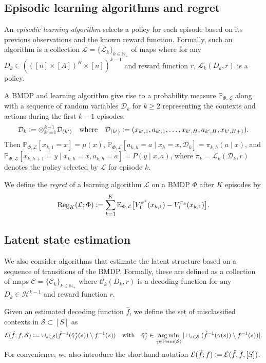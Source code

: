 \documentclass[11pt]{article}
\newcommand{\eqdef}{\vcentcolon=}
\newcommand{\mcC}{\mathcal{C}}
\newcommand{\mcD}{\mathcal{D}}
\newcommand{\mcE}{\mathcal{E}}
\newcommand{\mcH}{\mathcal{H}}
\newcommand{\mcL}{\mathcal{L}}
\newcommand{\mcS}{\mathcal{S}}
\newcommand{\mbbP}{\mathbb{P}}
\newcommand{\mbbE}{\mathbb{E}}
\newcommand{\mbbN}{\mathbb{N}}
\newcommand{\reg}{\textnormal{Reg}}
\DeclareMathOperator*{\argmin}{arg\,min}
\theoremstyle{definition}
\theoremstyle{definition}
\begin{document}
\subsection{Episodic learning algorithms and regret}
\label{sec:preliminaries-episodes}

An \textit{episodic learning algorithm} selects a policy for each episode based on its previous observations and the known reward function.
Formally, such an algorithm is a collection $\mcL=\{\mcL_k\}_{k\in\mbbN_+}$ of maps where for any $D_k\in(([n]\times[A])^H\times[n])^{k-1}$ and reward function $r$, $\mcL_k(D_k,r)$ is a policy.

A \gls{BMDP} and learning algorithm give rise to a probability measure $\mbbP_{\Phi,\mcL}$ along with a sequence of random variables $\mcD_k$ for $k\geq 2$ representing the contexts and actions during the first $k-1$ episodes:
\begin{equation}
	\label{eqn:historydef}
	\mcD_{k}
	\eqdef
	\otimes_{k'=1}^{k-1}\mcD_{(k')}
	\quad \mathrm{where}
	\quad
	\mcD_{(k')}
	\eqdef
	(x_{k',1},a_{k',1},\ldots,x_{k',H},a_{k',H},x_{k',H+1})
	.
\end{equation}
Then $\mbbP_{\Phi,\mcL}[x_{k,1}=x]=\mu(x)$, $\mbbP_{\Phi,\mcL}[a_{k,h}=a \mid x_h=x,\mcD_k]=\pi_{k,h}(a\mid x)$, and $\mbbP_{\Phi,\mcL}[x_{k,h+1}=y\mid x_{k,h}=x,a_{k,h}=a]=P(y\mid x,a)$, where $\pi_{k}=\mcL_k(\mcD_k,r)$ denotes the policy selected by $\mcL$ for episode $k$.

We define the \textit{regret} of a learning algorithm $\mcL$ on a \gls{BMDP} $\Phi$ after $K$ episodes by
\begin{equation}
	\label{eqn:regret_def}
	\reg_K(\mcL;\Phi)
	\eqdef
	\sum_{k=1}^K
	\mbbE_{\Phi,\mcL}
	\bigl[V_{1}^{\pi^*}(x_{k,1})-V_{1}^{\pi_k}(x_{k,1})\bigr]
	.
\end{equation}

\subsection{Latent state estimation}
\label{sec:preliminaries_latent_state_estimation}

We also consider algorithms that estimate the latent structure based on a sequence of transitions of the \gls{BMDP}.
Formally, these are defined as a collection of maps $\mcC=\{\mcC_k\}_{k\in\mbbN_+}$ where $\mcC_k(D_k,r)$ is a decoding function for any $D_k\in\mcH^{k-1}$ and reward function $r$.

Given an estimated decoding function $\hat{f}$, we define the set of misclassified contexts in $\mcS\subset[S]$ as
\begin{equation}
	\label{eqn:misclassdef}
	\mcE(\hat{f};f,\mcS)
	\eqdef
	\cup_{s\in\mcS} (\hat{f}^{-1}(\hat{\gamma}^*_f(s))\setminus f^{-1}(s))
	\quad
	\mathrm{with}
	\quad
	\hat{\gamma}^*_f
	\in
	\argmin_{\gamma\in\mathrm{Perm}(\mcS)}
	|\cup_{s\in\mcS} (\hat{f}^{-1}(\gamma(s))\setminus f^{-1}(s))|
	.
\end{equation}
For convenience, we also introduce the shorthand notation $\mcE(\hat{f};f)\eqdef \mcE(\hat{f};f,[S])$.
\end{document}
